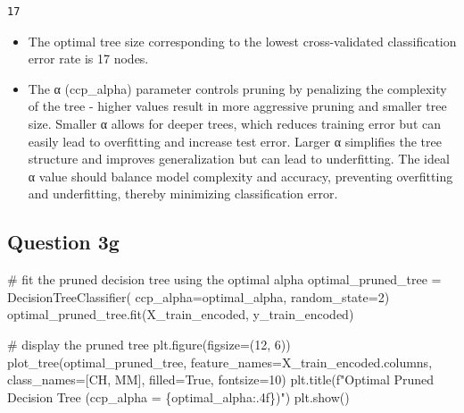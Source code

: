 \documentclass[
  letterpaper,
  DIV=11,
  numbers=noendperiod]{scrartcl}
\newenvironment{Shaded}{\begin{snugshade}}{\end{snugshade}}
\newcommand{\CommentTok}[1]{\textcolor[rgb]{0.37,0.37,0.37}{#1}}
\newcommand{\DecValTok}[1]{\textcolor[rgb]{0.68,0.00,0.00}{#1}}
\newcommand{\NormalTok}[1]{\textcolor[rgb]{0.00,0.23,0.31}{#1}}
\newcommand{\OperatorTok}[1]{\textcolor[rgb]{0.37,0.37,0.37}{#1}}
\newcommand{\SpecialCharTok}[1]{\textcolor[rgb]{0.37,0.37,0.37}{#1}}
\newcommand{\SpecialStringTok}[1]{\textcolor[rgb]{0.13,0.47,0.30}{#1}}
\newcommand{\StringTok}[1]{\textcolor[rgb]{0.13,0.47,0.30}{#1}}
\newcommand{\VariableTok}[1]{\textcolor[rgb]{0.07,0.07,0.07}{#1}}
\providecommand{\tightlist}{%
  \setlength{\itemsep}{0pt}\setlength{\parskip}{0pt}}\usepackage{longtable,booktabs,array}
\begin{document}
\begin{verbatim}
17
\end{verbatim}

\begin{itemize}
\tightlist
\item
  The optimal tree size corresponding to the lowest cross-validated
  classification error rate is 17 nodes.
\item
  The α (ccp\_alpha) parameter controls pruning by penalizing the
  complexity of the tree - higher values \hspace{0pt}\hspace{0pt}result
  in more aggressive pruning and smaller tree size. Smaller α allows for
  deeper trees, which reduces training error but can easily lead to
  overfitting and increase test error. Larger α simplifies the tree
  structure and improves generalization but can lead to underfitting.
  The ideal α value should balance model complexity and accuracy,
  preventing overfitting and underfitting, thereby minimizing
  classification error.
\end{itemize}

\subsection{Question 3g}\label{question-3g}

\begin{Shaded}
\begin{Highlighting}[]
\CommentTok{\# fit the pruned decision tree using the optimal alpha}
\NormalTok{optimal\_pruned\_tree }\OperatorTok{=}\NormalTok{ DecisionTreeClassifier(}
\NormalTok{    ccp\_alpha}\OperatorTok{=}\NormalTok{optimal\_alpha, random\_state}\OperatorTok{=}\DecValTok{2}\NormalTok{)}
\NormalTok{optimal\_pruned\_tree.fit(X\_train\_encoded, y\_train\_encoded)}

\CommentTok{\# display the pruned tree}
\NormalTok{plt.figure(figsize}\OperatorTok{=}\NormalTok{(}\DecValTok{12}\NormalTok{, }\DecValTok{6}\NormalTok{))}
\NormalTok{plot\_tree(optimal\_pruned\_tree, feature\_names}\OperatorTok{=}\NormalTok{X\_train\_encoded.columns,}
\NormalTok{          class\_names}\OperatorTok{=}\NormalTok{[}\StringTok{\textquotesingle{}CH\textquotesingle{}}\NormalTok{, }\StringTok{\textquotesingle{}MM\textquotesingle{}}\NormalTok{], filled}\OperatorTok{=}\VariableTok{True}\NormalTok{, fontsize}\OperatorTok{=}\DecValTok{10}\NormalTok{)}
\NormalTok{plt.title(}\SpecialStringTok{f"Optimal Pruned Decision Tree (ccp\_alpha = }\SpecialCharTok{\{}\NormalTok{optimal\_alpha}\SpecialCharTok{:.4f\}}\SpecialStringTok{)"}\NormalTok{)}
\NormalTok{plt.show()}
\end{Highlighting}
\end{Shaded}
\end{document}
